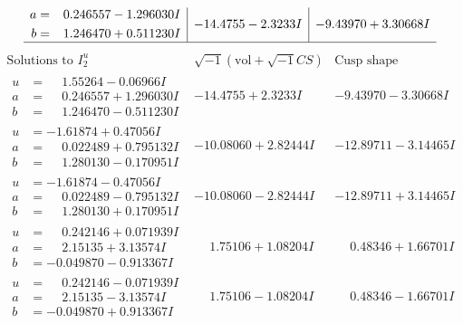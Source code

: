 \documentclass[1p]{elsarticle_modified}
\theoremstyle{definition}
\newcommand{\I}{\sqrt{-1}}
\begin{document}
$$\begin{array}{c|c|c}
\begin{aligned}
a &= \phantom{-}0.246557 - 1.296030 I \\
b &= \phantom{-}1.246470 + 0.511230 I\end{aligned}
 & -14.4755 - 2.3233 I & -9.43970 + 3.30668 I\\
 \hline 
 \end{array}$$\newpage$$\begin{array}{c|c|c}  
\text{Solutions to }I^u_{2}& \I (\text{vol} + \sqrt{-1}CS) & \text{Cusp shape}\\
 \hline 
\begin{aligned}
u &= \phantom{-}1.55264 - 0.06966 I \\
a &= \phantom{-}0.246557 + 1.296030 I \\
b &= \phantom{-}1.246470 - 0.511230 I\end{aligned}
 & -14.4755 + 2.3233 I & -9.43970 - 3.30668 I \\ \hline\begin{aligned}
u &= -1.61874 + 0.47056 I \\
a &= \phantom{-}0.022489 + 0.795132 I \\
b &= \phantom{-}1.280130 - 0.170951 I\end{aligned}
 & -10.08060 + 2.82444 I & -12.89711 - 3.14465 I \\ \hline\begin{aligned}
u &= -1.61874 - 0.47056 I \\
a &= \phantom{-}0.022489 - 0.795132 I \\
b &= \phantom{-}1.280130 + 0.170951 I\end{aligned}
 & -10.08060 - 2.82444 I & -12.89711 + 3.14465 I \\ \hline\begin{aligned}
u &= \phantom{-}0.242146 + 0.071939 I \\
a &= \phantom{-}2.15135 + 3.13574 I \\
b &= -0.049870 - 0.913367 I\end{aligned}
 & \phantom{-}1.75106 + 1.08204 I & \phantom{-}0.48346 + 1.66701 I \\ \hline\begin{aligned}
u &= \phantom{-}0.242146 - 0.071939 I \\
a &= \phantom{-}2.15135 - 3.13574 I \\
b &= -0.049870 + 0.913367 I\end{aligned}
 & \phantom{-}1.75106 - 1.08204 I & \phantom{-}0.48346 - 1.66701 I \\ \hline\begin{aligned}

\end{aligned}
\end{array}$$
\end{document}
